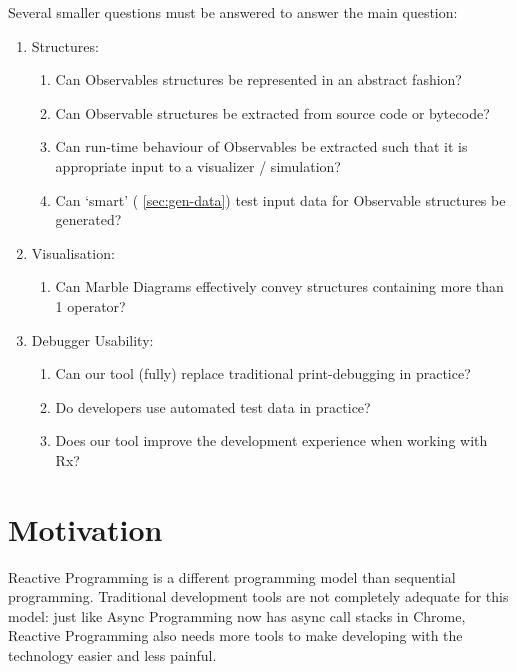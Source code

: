 \noindent
Several smaller questions must be answered to answer the main question:

\begin{enumerate}

    \item
        Structures:
        \begin{enumerate}
            \item
                Can Observables structures be represented in an abstract
                fashion?
            \item
                Can Observable structures be extracted from source code
                or bytecode?
            \item
                Can run-time behaviour of Observables be extracted such
                that it is appropriate input to a visualizer /
                simulation?
            \item
                Can `smart' (%
                \ref{sec:gen-data}) test input data for Observable
                structures be generated?
        \end{enumerate}

    \item
        Visualisation:
        \begin{enumerate}
            \item
                Can Marble Diagrams effectively convey structures
                containing more than 1 operator?
        \end{enumerate}

    \item
        Debugger Usability:
        \begin{enumerate}
            \item
                Can our tool (fully) replace traditional print-debugging
                in practice?
            \item
                Do developers use automated test data in practice?
            \item
                Does our tool improve the development experience when
                working with Rx?
        \end{enumerate}

\end{enumerate}

\section{Motivation} Reactive Programming is a different programming
model than sequential programming.  Traditional development tools are
not completely adequate for this model:  just like Async Programming now
has async call stacks in Chrome, Reactive Programming also needs more
tools to make developing with the technology easier and less painful.

